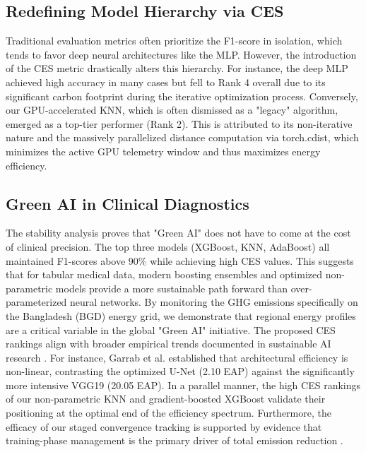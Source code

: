 \documentclass[conference]{IEEEtran}
\begin{document}
\subsection{Redefining Model Hierarchy via CES}
Traditional evaluation metrics often prioritize the F1-score in isolation, which tends to favor deep neural architectures like the MLP. However, the introduction of the CES metric drastically alters this hierarchy. For instance, the deep MLP achieved high accuracy in many cases but fell to Rank 4 overall due to its significant carbon footprint during the iterative optimization process. Conversely, our GPU-accelerated KNN, which is often dismissed as a "legacy" algorithm, emerged as a top-tier performer (Rank 2). This is attributed to its non-iterative nature and the massively parallelized distance computation via torch.cdist, which minimizes the active GPU telemetry window and thus maximizes energy efficiency.
\subsection{Green AI in Clinical Diagnostics}
The stability analysis proves that "Green AI" does not have to come at the cost of clinical precision. The top three models (XGBoost, KNN, AdaBoost) all maintained F1-scores above 90\% while achieving high CES values. This suggests that for tabular medical data, modern boosting ensembles and optimized non-parametric models provide a more sustainable path forward than over-parameterized neural networks. By monitoring the GHG emissions specifically on the Bangladesh (BGD) energy grid, we demonstrate that regional energy profiles are a critical variable in the global "Green AI" initiative. The proposed CES rankings align with broader empirical trends documented in sustainable AI research \cite{b2,b3}. For instance, Garrab et al. \cite{b3} established that architectural efficiency is non-linear, contrasting the optimized U-Net (2.10 EAP) against the significantly more intensive VGG19 (20.05 EAP). In a parallel manner, the high CES rankings of our non-parametric KNN and gradient-boosted XGBoost validate their positioning at the optimal end of the efficiency spectrum. Furthermore, the efficacy of our staged convergence tracking is supported by evidence that training-phase management is the primary driver of total emission reduction \cite{b2}.
\end{document}
